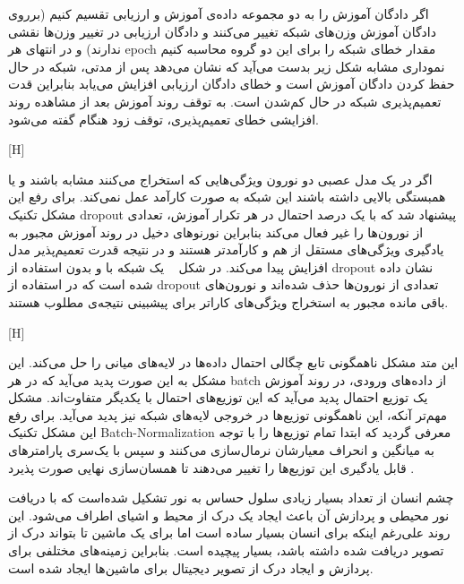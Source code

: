 اگر دادگان آموزش را به دو مجموعه داده‌ی آموزش و ارزیابی تقسیم کنیم (برروی دادگان آموزش وزن‌های شبکه تغییر می‌کنند و دادگان ارزیابی در تغییر وزن‌ها نقشی ندارند) و در انتهای هر epoch مقدار خطای شبکه را برای این دو گروه محاسبه کنیم نموداری مشابه شکل زیر بدست می‌آید که نشان می‌دهد پس از مدتی، شبکه در حال حفظ کردن دادگان آموزش است و خطای دادگان ارزیابی افزایش می‌یابد بنابراین قدت تعمیم‌پذیری شبکه در حال کم‌شدن است. به توقف روند آموزش بعد از مشاهده روند افزایشی خطای تعمیم‌پذیری، توقف زود هنگام گفته می‌شود.

[H]

اگر در یک مدل عصبی دو نورون ویژگی‌هایی که استخراج می‌کنند مشابه باشند و یا همبستگی بالایی داشته باشند این شبکه به صورت کارآمد عمل نمی‌کند. برای رفع این مشکل تکنیک dropout پیشنهاد شد که با یک درصد احتمال در هر تکرار آموزش، تعدادی از نورون‌ها را غیر فعال می‌کند بنابراین نورنو‌های دخیل در روند آموزش مجبور به یادگیری ویژگی‌های مستقل از هم و کارآمدتر هستند و در نتیجه قدرت تعمیم‌پذیر مدل افزایش پیدا می‌کند. در شکل ~ یک شبکه با و بدون استفاده از dropout نشان داده شده است که در استفاده از dropout تعدادی از نورون‌ها حذف شده‌اند و نورون‌های باقی مانده مجبور به استخراج ویژگی‌های کاراتر برای پیشبینی نتیجه‌ی مطلوب هستند.

[H]

این متد مشکل ناهمگونی تابع چگالی احتمال داده‌ها در لایه‌های میانی را حل می‌کند. این مشکل به این صورت پدید می‌آید که در هر batch از داده‌های ورودی، در روند آموزش یک توزیع احتمال پدید می‌آید که این توزیع‌های احتمال‌ با یکدیگر متفاوت‌اند. مشکل مهم‌تر آنکه، این ناهمگونی توزیع‌ها در  خروجی لایه‌های شبکه نیز پدید می‌آید. برای رفع این مشکل تکنیک Batch-Normalization معرفی گردید که ابتدا تمام توزیع‌ها را با توجه به میانگین و انحراف معیارشان نرمال‌سازی می‌کنند و سپس با یک‌سری پارامتر‌های قابل یادگیری این توزیع‌ها را تغییر می‌دهند تا همسان‌سازی نهایی صورت پذیرد . 

چشم انسان از تعداد بسیار زیادی سلول حساس به نور تشکیل شده‌است که با دریافت نور محیطی و پردازش آن باعث ایجاد یک درک از محیط و اشیای اطراف می‌شود. این روند علی‌رغم اینکه برای انسان بسیار ساده است اما برای یک ماشین تا بتواند درک از تصویر دریافت شده داشته باشد، بسیار پیچیده است. بنابراین زمینه‌های مختلفی برای پردازش و ایجاد درک از تصویر دیجیتال برای ماشین‌ها ایجاد شده است.

